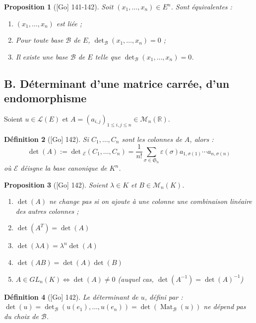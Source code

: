 \documentclass[10pt, a4paper, parskip=full, twoside, twocolumn]{report}
\newtheorem{definition}{Définition}
\newtheorem{proposition}[definition]{Proposition}
\newcommand{\IR}{\mathbb{R}}
\newcommand{\M}{\mathcal{M}}
\DeclareMathOperator{\Mat}{Mat}
\begin{document}
\begin{proposition}[\textnormal{[Go] 141-142}]
	Soit $(x_1,\dots, x_n)\in E^n$. Sont équivalentes :
	\begin{enumerate}
		\item $(x_1,\dots, x_n)$ est liée ;
		\item Pour toute base $\mathcal{B}$ de $E$, $\det_{\mathcal{B}}(x_1,\dots,x_n) = 0$ ;
		\item Il existe une base $\mathcal{B}$ de $E$ telle que $\det_{\mathcal{B}}(x_1,\dots, x_n) = 0$.
	\end{enumerate}
\end{proposition}

\subsection*{B. Déterminant d'une matrice carrée, d'un endomorphisme}
\textcolor{paragraphtext}{Soient $u\in\mathcal{L}(E)$ et $A = \left(a_{i,j}\right)_{1\leq i,j\leq n} \in \M_n(\IR)$.}

\begin{definition}[\textnormal{[Go] 142}]
	Si $C_1,\dots, C_n$ sont les colonnes de $A$, alors :
	$$\det(A) := \det{}_{\mathcal{E}}(C_1,\dots,C_n) = \frac{1}{n!}\sum_{\sigma\in\mathfrak{S}_n} \varepsilon(\sigma)a_{1,\sigma(1)}\cdots a_{n,\sigma(n)}$$
	où $\mathcal{E}$ déisgne la base canonique de $K^n$.
\end{definition}

\begin{proposition}[\textnormal{[Go] 142}]
	Soient $\lambda\in K$ et $B\in\M_n(K)$.
	\begin{enumerate}
		\item $\det(A)$ ne change pas si on ajoute à une colonne une combinaison linéaire des autres colonnes ;
		\item $\det(A^T)=\det(A)$
		\item $\det(\lambda A) = \lambda^n \det(A)$
		\item $\det(AB) = \det(A)\det(B)$
		\item $A\in GL_n(K)\iff \det(A)\neq 0$ (auquel cas, $\det(A^{-1}) = {\det(A)}^{-1}$)
	\end{enumerate}
\end{proposition}

\begin{definition}[\textnormal{[Go] 142}]
	Le déterminant de $u$, défini par :
	$\det(u) = \det_{\mathcal{B}}(u(e_1),\dots, u(e_n)) = \det(\Mat_{\mathcal{B}}(u))$
	ne dépend pas du choix de $\mathcal{B}$.
\end{definition}
\end{document}
